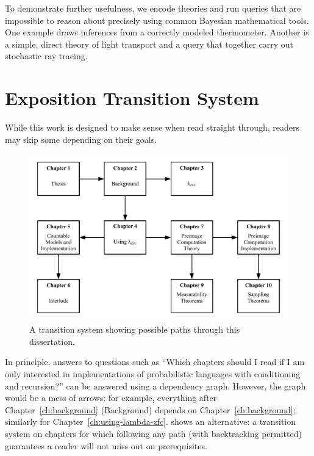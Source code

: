 To demonstrate further usefulness, we encode theories and run queries that are impossible to reason about precisely using common Bayesian mathematical tools.
One example draws inferences from a correctly modeled thermometer.
Another is a simple, direct theory of light transport and a query that together carry out stochastic ray tracing.

\section{Exposition Transition System}

While this work is designed to make sense when read straight through, readers may skip some depending on their goals.

\begin{figure}[!tb]\centering
\includegraphics[width=\textwidth]{reading-graph}
\caption[A transition system for reading this dissertation]{A transition system showing possible paths through this dissertation.}
\label{fig:reading-graph}
\end{figure}

In principle, answers to questions such as ``Which chapters should I read if I am only interested in implementations of probabilistic languages with conditioning and recursion?'' can be answered using a dependency graph.
However, the graph would be a mess of arrows: for example, everything after Chapter~\ref{ch:background} (Background) depends on Chapter~\ref{ch:background}; similarly for Chapter~\ref{ch:using-lambda-zfc}.
 shows an alternative: a transition system on chapters for which following any path (with backtracking permitted) guarantees a reader will not miss out on prerequisites.

